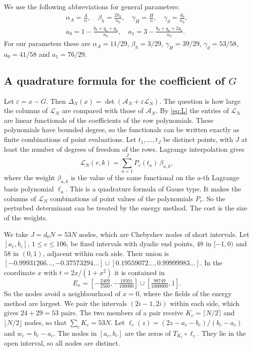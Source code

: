 \documentclass[11pt]{amsart}
\theoremstyle{definition}
\theoremstyle{remark}
\numberwithin{equation}{section}
\newcommand{\cA}{\mathcal A}
\newcommand{\cL}{\mathcal L}
\begin{document}
We use the following abbreviations for general parameters:
\begin{gather*}
 \alpha_A=\frac An,\quad \beta_h=\frac{2h_0}{n_0},\quad \gamma_H=\frac Hn,\quad \gamma_d=\frac{d_0}{n_0},\\
 a_0=1-\frac{b_0+q_0+g_0}{n_0},\quad a_1=3-\frac{b_0+q_0+2g_0}{n_0}.
\end{gather*}
For our parameters these are $\alpha_A=11/29$, $\beta_h=3/29$, $\gamma_H=39/29$, $\gamma_d=53/58$,
$a_0=41/58$ and $a_1=76/29$.

\subsection{A quadrature formula for the coefficient of $G$}\label{ssec:quadrature}
Let $\varepsilon=x-G$. Then $\Delta_N(x)=\det(\cA_N+\varepsilon\cL_N)$. The question is how large the columns
of $\cL_N$ are compared with those of $\cA_N$. By \eqref{eq:L} the entries of $\cL_N$ are linear
functionals of the coefficients of the row polynomials. These polynomials have bounded degree, so the
functionals can be written exactly as finite combinations of point evaluations. Let $t_1,\ldots,t_J$ be
distinct points, with $J$ at least the number of degrees of freedom of the rows. Lagrange interpolation
gives
\begin{equation}\label{eq:quad}
 \cL_N(r,k)=\sum_{a=1}^JP_r(t_a)\,\beta_{a,k},
\end{equation}
where the weight $\beta_{a,k}$ is the value of the same functional on the $a$-th Lagrange basis polynomial
$\ell_a$. This is a quadrature formula of Gauss type. It makes the columns of $\cL_N$ combinations of point
values of the polynomials $P_r$. So the perturbed determinant can be treated by the energy
method. The cost is the size of the weights.

We take $J=d_0N=53N$ nodes, which are Chebyshev nodes of short intervals. Let $[a_c,b_c]$,
$1\le c\le106$, be fixed intervals with dyadic end points, $48$ in $[-1,0)$ and $58$ in $(0,1)$, adjacent
within each side. Their union is $[-0.99931266\ldots,-0.37573294\ldots]\cup[0.19559072\ldots,0.99999983\ldots]$. In
the coordinate $x$ with $t=2x/(1+x^2)$ it is contained in
\[
 E_x=[-\tfrac{2409}{2500},-\tfrac{19501}{100000}]\cup[\tfrac{98749}{1000000},1].
\]
So the nodes avoid a neighbourhood of $x=0$, where the fields of the energy method are largest. We pair the
intervals $(2i-1,2i)$ within each side, which gives $24+29=53$ pairs. The two members of a pair receive
$K_c=\lceil N/2\rceil$ and $\lfloor N/2\rfloor$ nodes, so that $\sum_cK_c=53N$. Let
$\ell_c(z)=(2z-a_c-b_c)/(b_c-a_c)$ and $w_c=b_c-a_c$. The nodes in $[a_c,b_c]$ are the zeros of
$T_{K_c}\circ\ell_c$. They lie in the open interval, so all nodes are distinct.
\end{document}
